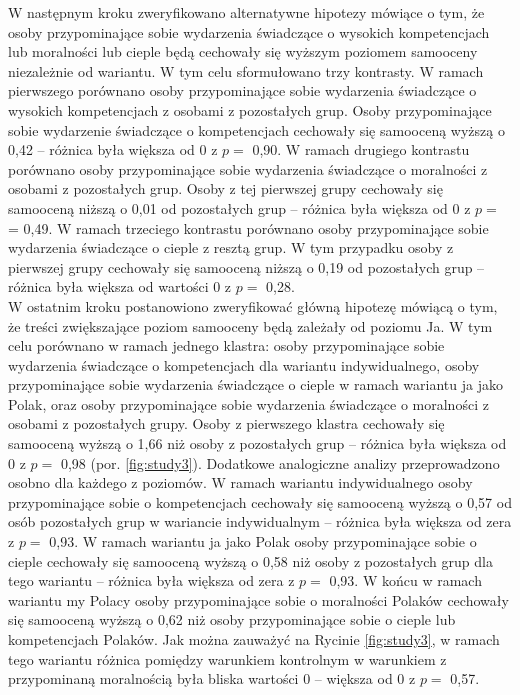 \documentclass[man]{apa6}
\begin{document}
W następnym kroku zweryfikowano alternatywne hipotezy mówiące o tym, że osoby przypominające sobie wydarzenia świadczące o wysokich kompetencjach lub moralności lub cieple będą cechowały się wyższym poziomem samooceny niezależnie od wariantu. W tym celu sformułowano trzy kontrasty. W ramach pierwszego porównano osoby przypominające sobie wydarzenia świadczące o wysokich kompetencjach z osobami z pozostałych grup. Osoby przypominające sobie wydarzenie świadczące o kompetencjach cechowały się samooceną wyższą o 0,42 -- różnica była większa od 0 z $p =$ 0,90. W ramach drugiego kontrastu porównano osoby przypominające sobie wydarzenia świadczące o moralności z osobami z pozostałych grup. Osoby z tej pierwszej grupy cechowały się samooceną niższą o 0,01 od pozostałych grup -- różnica była większa od 0 z $p =$ = 0,49. W ramach trzeciego kontrastu porównano osoby przypominające sobie wydarzenia świadczące o cieple z resztą grup. W tym przypadku osoby z pierwszej grupy cechowały się samooceną niższą o 0,19 od pozostałych grup -- różnica była większa od wartości 0 z $p =$ 0,28. \\

W ostatnim kroku postanowiono zweryfikować główną hipotezę mówiącą o tym, że treści zwiększające poziom samooceny będą zależały od poziomu Ja. W tym celu porównano w ramach jednego klastra: osoby przypominające sobie wydarzenia świadczące o kompetencjach dla wariantu indywidualnego, osoby przypominające sobie wydarzenia świadczące o cieple w ramach wariantu ja jako Polak, oraz osoby przypominające sobie wydarzenia świadczące o moralności z osobami z pozostałych grupy. Osoby z pierwszego klastra cechowały się samooceną wyższą o 1,66 niż osoby z pozostałych grup -- różnica była większa od 0 z $p =$ 0,98 (por. \ref{fig:study3}). Dodatkowe analogiczne analizy przeprowadzono osobno dla każdego z poziomów. W ramach wariantu indywidualnego osoby przypominające sobie o kompetencjach cechowały się samooceną wyższą o 0,57 od osób pozostałych grup w wariancie indywidualnym -- różnica była większa od zera z $p =$ 0,93. W ramach wariantu ja jako Polak osoby przypominające sobie o cieple cechowały się samooceną wyższą o 0,58 niż osoby z pozostałych grup dla tego wariantu -- różnica była większa od zera z $p =$ 0,93. W końcu w ramach wariantu my Polacy osoby przypominające sobie o moralności Polaków cechowały się samooceną wyższą o 0,62 niż osoby przypominające sobie o cieple lub kompetencjach Polaków. Jak można zauważyć na Rycinie \ref{fig:study3}, w ramach tego wariantu różnica pomiędzy warunkiem kontrolnym w warunkiem z przypominaną moralnością była bliska wartości 0 -- większa od 0 z $p =$ 0,57.
\end{document}
